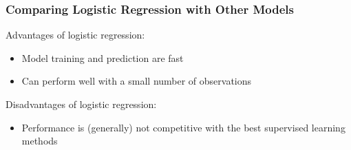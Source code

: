 \begin{frame}[fragile]\frametitle{Comparing Logistic Regression with Other Models}
Advantages of logistic regression:
\begin{itemize}
\item     Model training and prediction are fast
\item     Can perform well with a small number of observations
\end{itemize}
Disadvantages of logistic regression:
\begin{itemize}
\item     Performance is (generally) not competitive with the best supervised learning methods

\end{itemize}
\end{frame}


